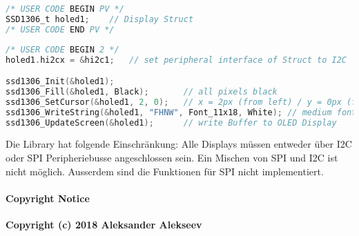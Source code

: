 \begin{lstlisting}[language=c]
/* USER CODE BEGIN PV */
SSD1306_t holed1;    // Display Struct
/* USER CODE END PV */
\end{lstlisting}

\begin{lstlisting}[language=c]
/* USER CODE BEGIN 2 */
holed1.hi2cx = &hi2c1;   // set peripheral interface of Struct to I2C

ssd1306_Init(&holed1);
ssd1306_Fill(&holed1, Black);       // all pixels black
ssd1306_SetCursor(&holed1, 2, 0);   // x = 2px (from left) / y = 0px (from top)
ssd1306_WriteString(&holed1, "FHNW", Font_11x18, White); // medium font
ssd1306_UpdateScreen(&holed1);      // write Buffer to OLED Display
\end{lstlisting}

Die Library hat folgende Einschränkung: Alle Displays müssen entweder über I2C oder SPI Peripheriebusse angeschlossen sein.
Ein Mischen von SPI und I2C ist nicht möglich. Ausserdem sind die Funktionen für SPI nicht implementiert.

\paragraph{Copyright Notice}

\textbf{Copyright (c) 2018 Aleksander Alekseev}\
\
\
